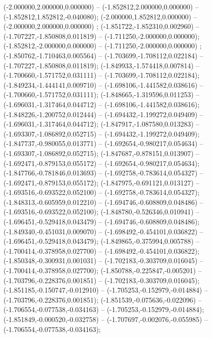  (-2.000000,2.000000,0.000000) -- (-1.852812,2.000000,0.000000) -- (-1.852812,1.852812,-0.040080);
 (-2.000000,1.852812,0.000000) -- (-2.000000,2.000000,0.000000) ;
 (-1.851722,-1.852310,0.002960) -- (-1.707227,-1.850808,0.011819) -- (-1.711250,-2.000000,0.000000);
 (-1.852812,-2.000000,0.000000) -- (-1.711250,-2.000000,0.000000) ;
 (-1.850762,-1.710463,0.005564) -- (-1.703699,-1.708112,0.022184) -- (-1.707227,-1.850808,0.011819);
 (-1.849933,-1.574418,0.007814) -- (-1.700660,-1.571752,0.031111) -- (-1.703699,-1.708112,0.022184);
 (-1.849234,-1.444141,0.009710) -- (-1.698106,-1.441582,0.038616) -- (-1.700660,-1.571752,0.031111);
 (-1.848665,-1.319596,0.011253) -- (-1.696031,-1.317464,0.044712) -- (-1.698106,-1.441582,0.038616);
 (-1.848226,-1.200752,0.012444) -- (-1.694432,-1.199272,0.049409) -- (-1.696031,-1.317464,0.044712);
 (-1.847917,-1.087580,0.013283) -- (-1.693307,-1.086892,0.052715) -- (-1.694432,-1.199272,0.049409);
 (-1.847737,-0.980055,0.013771) -- (-1.692654,-0.980217,0.054634) -- (-1.693307,-1.086892,0.052715);
 (-1.847687,-0.878151,0.013907) -- (-1.692471,-0.879153,0.055172) -- (-1.692654,-0.980217,0.054634);
 (-1.847766,-0.781846,0.013693) -- (-1.692758,-0.783614,0.054327) -- (-1.692471,-0.879153,0.055172);
 (-1.847975,-0.691121,0.013127) -- (-1.693516,-0.693522,0.052100) -- (-1.692758,-0.783614,0.054327);
 (-1.848313,-0.605959,0.012210) -- (-1.694746,-0.608809,0.048486) -- (-1.693516,-0.693522,0.052100);
 (-1.848780,-0.526346,0.010941) -- (-1.696451,-0.529418,0.043479) -- (-1.694746,-0.608809,0.048486);
 (-1.849340,-0.451031,0.009070) -- (-1.698492,-0.454101,0.036822) -- (-1.696451,-0.529418,0.043479);
 (-1.849865,-0.375994,0.005788) -- (-1.700414,-0.378958,0.027700) -- (-1.698492,-0.454101,0.036822);
 (-1.850348,-0.300931,0.001031) -- (-1.702183,-0.303709,0.016045) -- (-1.700414,-0.378958,0.027700);
 (-1.850788,-0.225847,-0.005201) -- (-1.703796,-0.228376,0.001851) -- (-1.702183,-0.303709,0.016045);
 (-1.851185,-0.150747,-0.012910) -- (-1.705253,-0.152979,-0.014884) -- (-1.703796,-0.228376,0.001851);
 (-1.851539,-0.075636,-0.022096) -- (-1.706554,-0.077538,-0.034163) -- (-1.705253,-0.152979,-0.014884);
 (-1.851849,-0.000520,-0.032758) -- (-1.707697,-0.002076,-0.055985) -- (-1.706554,-0.077538,-0.034163);
